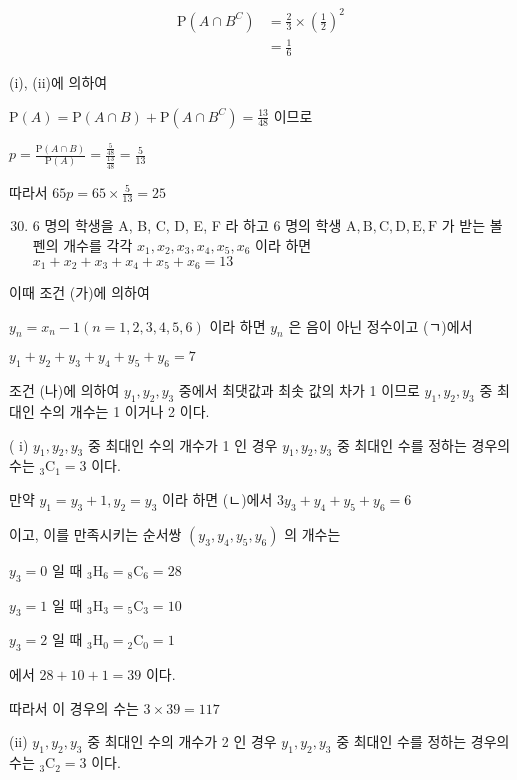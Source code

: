 \documentclass[10pt]{article}
\begin{document}
\[
\begin{aligned}
\mathrm{P}\left(A \cap B^{C}\right) & =\frac{2}{3} \times\left(\frac{1}{2}\right)^{2} \\
& =\frac{1}{6}
\end{aligned}
\]

(i), (ii)에 의하여

\(\mathrm{P}(A)=\mathrm{P}(A \cap B)+\mathrm{P}\left(A \cap B^{C}\right)=\frac{13}{48}\) 이므로

\(p=\frac{\mathrm{P}(A \cap B)}{\mathrm{P}(A)}=\frac{\frac{5}{48}}{\frac{13}{48}}=\frac{5}{13}\)

따라서 \(65 p=65 \times \frac{5}{13}=25\)

\begin{enumerate}
  \setcounter{enumi}{29}
  \item 6 명의 학생을 A, B, C, D, E, F 라 하고 6 명의 학생 \(\mathrm{A}, \mathrm{B}, \mathrm{C}, \mathrm{D}, \mathrm{E}, \mathrm{F}\) 가 받는 볼펜의 개수를 각각 \(x_{1}, x_{2}, x_{3}, x_{4}, x_{5}, x_{6}\) 이라 하면 \(x_{1}+x_{2}+x_{3}+x_{4}+x_{5}+x_{6}=13\)
\end{enumerate}

이때 조건 (가)에 의하여

\(y_{n}=x_{n}-1(n=1,2,3,4,5,6)\) 이라 하면 \(y_{n}\) 은 음이 아닌 정수이고 (ㄱ)에서

\(y_{1}+y_{2}+y_{3}+y_{4}+y_{5}+y_{6}=7\)

조건 (나)에 의하여 \(y_{1}, y_{2}, y_{3}\) 중에서 최댓값과 최솟 값의 차가 1 이므로 \(y_{1}, y_{2}, y_{3}\) 중 최대인 수의 개수는 1 이거나 2 이다.

( i) \(y_{1}, y_{2}, y_{3}\) 중 최대인 수의 개수가 1 인 경우 \(y_{1}, y_{2}, y_{3}\) 중 최대인 수를 정하는 경우의 수는 \({ }_{3} \mathrm{C}_{1}=3\) 이다.

만약 \(y_{1}=y_{3}+1, y_{2}=y_{3}\) 이라 하면 (ㄴ)에서 \(3 y_{3}+y_{4}+y_{5}+y_{6}=6\)

이고, 이를 만족시키는 순서쌍 \(\left(y_{3}, y_{4}, y_{5}, y_{6}\right)\) 의 개수는

\(y_{3}=0\) 일 때 \({ }_{3} \mathrm{H}_{6}={ }_{8} \mathrm{C}_{6}=28\)

\(y_{3}=1\) 일 때 \({ }_{3} \mathrm{H}_{3}={ }_{5} \mathrm{C}_{3}=10\)

\(y_{3}=2\) 일 때 \({ }_{3} \mathrm{H}_{0}={ }_{2} \mathrm{C}_{0}=1\)

에서 \(28+10+1=39\) 이다.

따라서 이 경우의 수는 \(3 \times 39=117\)

(ii) \(y_{1}, y_{2}, y_{3}\) 중 최대인 수의 개수가 2 인 경우 \(y_{1}, y_{2}, y_{3}\) 중 최대인 수를 정하는 경우의 수는 \({ }_{3} \mathrm{C}_{2}=3\) 이다.
\end{document}
